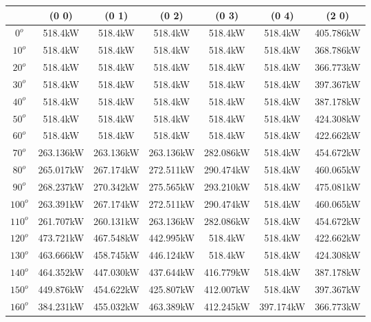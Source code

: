         \singlespacing
        \begin{table}[H]
        	\centering
        	\begin{tabular}{|c|c|c|c|c|c|c|} \hline
        			& (0 0)		& (0 1)		& (0 2)		& (0 3)		& (0 4)		& (2 0)		\\ \hline
        		$0^o$	& 518.4kW	& 518.4kW	& 518.4kW	& 518.4kW	& 518.4kW	& 405.786kW	\\ \hline
        		$10^o$	& 518.4kW	& 518.4kW	& 518.4kW	& 518.4kW	& 518.4kW	& 368.786kW	\\ \hline
        		$20^o$	& 518.4kW	& 518.4kW	& 518.4kW	& 518.4kW	& 518.4kW	& 366.773kW	\\ \hline
        		$30^o$	& 518.4kW	& 518.4kW	& 518.4kW	& 518.4kW	& 518.4kW	& 397.367kW	\\ \hline
        		$40^o$	& 518.4kW	& 518.4kW	& 518.4kW	& 518.4kW	& 518.4kW	& 387.178kW	\\ \hline
        		$50^o$	& 518.4kW	& 518.4kW	& 518.4kW	& 518.4kW	& 518.4kW	& 424.308kW	\\ \hline
        		$60^o$	& 518.4kW	& 518.4kW	& 518.4kW	& 518.4kW	& 518.4kW	& 422.662kW	\\ \hline
        		$70^o$	& 263.136kW	& 263.136kW	& 263.136kW	& 282.086kW	& 518.4kW	& 454.672kW	\\ \hline
        		$80^o$	& 265.017kW	& 267.174kW	& 272.511kW	& 290.474kW	& 518.4kW	& 460.065kW	\\ \hline
        		$90^o$	& 268.237kW	& 270.342kW	& 275.565kW	& 293.210kW	& 518.4kW	& 475.081kW	\\ \hline
        		$100^o$	& 263.391kW	& 267.174kW	& 272.511kW	& 290.474kW	& 518.4kW	& 460.065kW	\\ \hline
        		$110^o$	& 261.707kW	& 260.131kW	& 263.136kW	& 282.086kW	& 518.4kW	& 454.672kW	\\ \hline
        		$120^o$	& 473.721kW	& 467.548kW	& 442.995kW	& 518.4kW	& 518.4kW	& 422.662kW	\\ \hline
        		$130^o$	& 463.666kW	& 458.745kW	& 446.124kW	& 518.4kW	& 518.4kW	& 424.308kW	\\ \hline
        		$140^o$	& 464.352kW	& 447.030kW	& 437.644kW	& 416.779kW	& 518.4kW	& 387.178kW	\\ \hline
        		$150^o$	& 449.876kW	& 454.622kW	& 425.807kW	& 412.007kW	& 518.4kW	& 397.367kW	\\ \hline
        		$160^o$	& 384.231kW	& 455.032kW	& 463.389kW	& 412.245kW	& 397.174kW	& 366.773kW	\\ \hline

\end{tabular}
\end{table}
